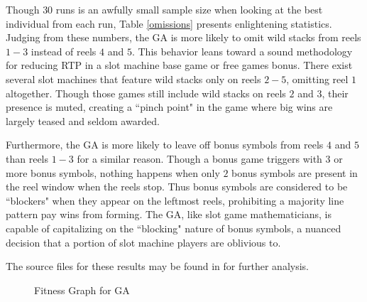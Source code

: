 \documentclass[conference]{IEEEtran}
\begin{document}
\par
Though $30$ runs is an awfully small sample size when looking at the best individual from each run, Table \ref{omissions} presents enlightening statistics.
Judging from these numbers, the GA is more likely to omit wild stacks from reels $1-3$ instead of reels $4$ and $5$.
This behavior leans toward a sound methodology for reducing RTP in a slot machine base game or free games bonus.
There exist several slot machines that feature wild stacks only on reels $2-5$, omitting reel $1$ altogether.
Though those games still include wild stacks on reels $2$ and $3$, their presence is muted, creating a ``pinch point" in the game where big wins are largely teased and seldom awarded.
\par
Furthermore, the GA is more likely to leave off bonus symbols from reels $4$ and $5$ than reels $1-3$ for a similar reason.
Though a bonus game triggers with $3$ or more bonus symbols, nothing happens when only $2$ bonus symbols are present in the reel window when the reels stop.
Thus bonus symbols are considered to be ``blockers" when they appear on the leftmost reels, prohibiting a majority line pattern pay wins from forming.
The GA, like slot game mathematicians, is capable of capitalizing on the ``blocking" nature of bonus symbols, a nuanced decision that a portion of slot machine players are oblivious to.
\par
The source files for these results may be found in \cite{ReelCharacteristicsRepo} for further analysis.
\begin{figure}[H]
	\centering
{}\datatable
{}
\caption{Fitness Graph for GA}\label{fig:fitnessGA}
\end{figure}
\end{document}
